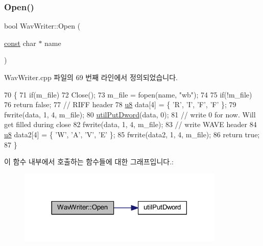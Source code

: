 \subsubsection{\texorpdfstring{Open()}{Open()}}
{\footnotesize\ttfamily bool Wav\+Writer\+::\+Open (\begin{DoxyParamCaption}\item[{\mbox{\hyperlink{getopt1_8c_a2c212835823e3c54a8ab6d95c652660e}{const}} char $\ast$}]{name }\end{DoxyParamCaption})}



Wav\+Writer.\+cpp 파일의 69 번째 라인에서 정의되었습니다.


\begin{DoxyCode}
70 \{
71   \textcolor{keywordflow}{if}(m\_file)
72     Close();
73   m\_file = fopen(name, \textcolor{stringliteral}{"wb"});
74 
75   \textcolor{keywordflow}{if}(!m\_file)
76     \textcolor{keywordflow}{return} \textcolor{keyword}{false};
77   \textcolor{comment}{// RIFF header}
78   \mbox{\hyperlink{_system_8h_aed742c436da53c1080638ce6ef7d13de}{u8}} data[4] = \{ \textcolor{charliteral}{'R'}, \textcolor{charliteral}{'I'}, \textcolor{charliteral}{'F'}, \textcolor{charliteral}{'F'} \};
79   fwrite(data, 1, 4, m\_file);
80   \mbox{\hyperlink{_util_8cpp_a61ef2cbdb9d8b5c50004ebd1557439c7}{utilPutDword}}(data, 0);
81   \textcolor{comment}{// write 0 for now. Will get filled during close}
82   fwrite(data, 1, 4, m\_file);
83   \textcolor{comment}{// write WAVE header}
84   \mbox{\hyperlink{_system_8h_aed742c436da53c1080638ce6ef7d13de}{u8}} data2[4] = \{ \textcolor{charliteral}{'W'}, \textcolor{charliteral}{'A'}, \textcolor{charliteral}{'V'}, \textcolor{charliteral}{'E'} \};
85   fwrite(data2, 1, 4, m\_file);
86   \textcolor{keywordflow}{return} \textcolor{keyword}{true};
87 \}
\end{DoxyCode}
이 함수 내부에서 호출하는 함수들에 대한 그래프입니다.\+:
\nopagebreak
\begin{figure}[H]
\begin{center}
\leavevmode
\includegraphics[width=278pt]{class_wav_writer_a18a057d0c1901caa6b08f528bd6908a7_cgraph}
\end{center}
\end{figure}
